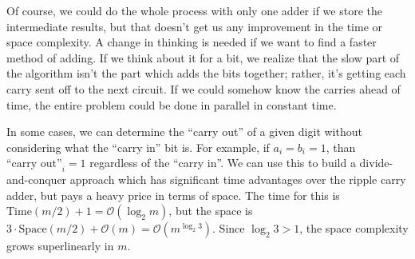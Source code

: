 Of course, we could do the whole process with only one adder if we store the intermediate results, but that doesn't get us any improvement in the time or space complexity.
A change in thinking is needed if we want to find a faster method of adding.
If we think about it for a bit, we realize that the slow part of the algorithm isn't the part which adds the bits together; rather, it's getting each carry sent off to the next circuit.
If we could somehow know the carries ahead of time, the entire problem could be done in parallel in constant time.




In some cases, we can determine the ``carry out'' of a given digit without considering what the ``carry in'' bit is.
For example, if $a_i = b_i = 1$, than $\text{``carry out''}_i = 1$ regardless of the ``carry in''.
We can use this to build a divide-and-conquer approach which has significant time advantages over the ripple carry adder, but pays a heavy price in terms of space.
The time for this is $\mathrm{Time}(m/2) + 1 = \mathcal{O}(\log_2 m)$, but the space is $3\cdot \mathrm{Space}(m/2) + \mathcal{O}(m) = \mathcal{O}(m^{\log_2 3})$.
Since $\log_2 3 > 1$, the space complexity grows superlinearly in $m$.